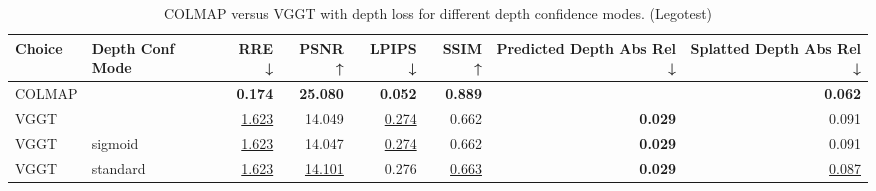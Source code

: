 \begin{table}[H]
\caption{COLMAP versus VGGT with depth loss for different depth confidence modes. (Legotest)}
\label{tab:05_depth_conf_mode_legotest}
\begin{tabular}{llrrrrrr}
\toprule
Choice & Depth Conf Mode & RRE ↓ & PSNR ↑ & LPIPS ↓ & SSIM ↑ & Predicted Depth Abs Rel ↓ & Splatted Depth Abs Rel ↓ \\
\midrule
COLMAP &  & \textbf{0.174} & \textbf{25.080} & \textbf{0.052} & \textbf{0.889} &  & \textbf{0.062} \\
VGGT &  & \underline{1.623} & 14.049 & \underline{0.274} & 0.662 & \textbf{0.029} & 0.091 \\
VGGT & sigmoid & \underline{1.623} & 14.047 & \underline{0.274} & 0.662 & \textbf{0.029} & 0.091 \\
VGGT & standard & \underline{1.623} & \underline{14.101} & 0.276 & \underline{0.663} & \textbf{0.029} & \underline{0.087} \\
\bottomrule
\end{tabular}
\end{table}
